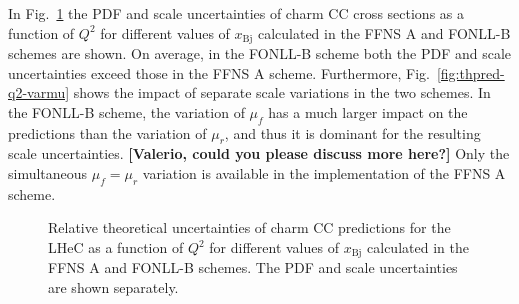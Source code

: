 \documentclass[pdftex,twocolumn,epjc3]{svjour3}          %
\newcommand{\xbj}{\ensuremath{x_{\text{Bj}}}\xspace}
\newcommand{\fonll} {{FONLL-B}\xspace}
\newcommand{\ffns} {{FFNS A}\xspace}
\begin{document}
In Fig.~\ref{fig:thpred-q2-unc} the PDF and scale uncertainties of charm CC cross sections as a function of $Q^2$ for different values of \xbj calculated in the \ffns and \fonll schemes are shown. On average, in the \fonll scheme both the PDF and scale uncertainties exceed those in the \ffns scheme. Furthermore, Fig.~\ref{fig:thpred-q2-varmu} shows the impact of separate scale variations in the two schemes. In the \fonll scheme, the variation of $\mu_f$ has a much larger impact on the predictions than the variation of $\mu_r$, and thus it is dominant for the resulting scale uncertainties. {\bf [Valerio, could you please discuss more here?]} Only the simultaneous $\mu_f = \mu_r$ variation is available in the implementation of the \ffns scheme. 

\begin{figure}
    \centering
    \caption{Relative theoretical uncertainties of charm CC predictions for the LHeC as a function of $Q^2$ for different values of \xbj calculated in the \ffns and \fonll schemes. The PDF and scale uncertainties are shown separately.}
    \label{fig:thpred-q2-unc}
\end{figure}
\end{document}
